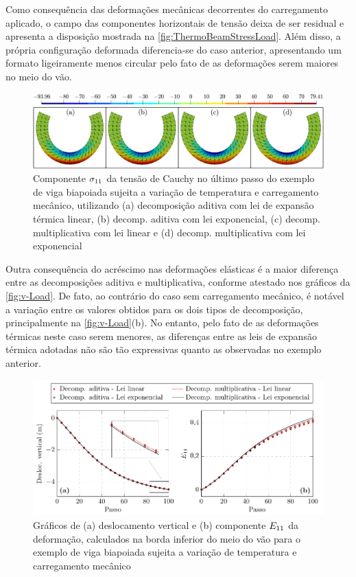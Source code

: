 \documentclass[Tese.tex]{subfiles}
\begin{document}
Como consequência das deformações mecânicas decorrentes do carregamento aplicado, o campo das componentes horizontais de tensão deixa de ser residual e apresenta a disposição mostrada na \autoref{fig:ThermoBeamStressLoad}. Além disso, a própria configuração deformada diferencia-se do caso anterior, apresentando um formato ligeiramente menos circular pelo fato de as deformações serem maiores no meio do vão.

\begin{figure}[!htb]
	\centering
	\caption{Componente ${\sigma}_{11}$ da tensão de Cauchy no último passo do exemplo de viga biapoiada sujeita a variação de temperatura e carregamento mecânico, utilizando (a) decomposição aditiva com lei de expansão térmica linear, (b) decomp. aditiva com lei exponencial, (c) decomp. multiplicativa com lei linear e (d) decomp. multiplicativa com lei exponencial}
	\label{fig:ThermoBeamStressLoad}
	\includegraphics[scale=0.39]{Figuras/ThermoBeam/ThermoBeamStress-Load.png}
\end{figure}

Outra consequência do acréscimo nas deformações elásticas é a maior diferença entre as decomposições aditiva e multiplicativa, conforme atestado nos gráficos da \autoref{fig:v-Load}. De fato, ao contrário do caso sem carregamento mecânico, é notável a variação entre os valores obtidos para os dois tipos de decomposição, principalmente na \autoref{fig:v-Load}(b). No entanto, pelo fato de as deformações térmicas neste caso serem menores, as diferenças entre as leis de expansão térmica adotadas não são tão expressivas quanto as observadas no exemplo anterior.

\begin{figure}[!htb]
	\centering
	\caption{Gráficos de (a) deslocamento vertical e (b) componente ${E}_{11}$ da deformação, calculados na borda inferior do meio do vão para o exemplo de viga biapoiada sujeita a variação de temperatura e carregamento mecânico}
	\label{fig:v-Load}
	\includegraphics[scale=1.1]{Figuras/ThermoBeam/v-Load.pdf}
\end{figure}
\end{document}
